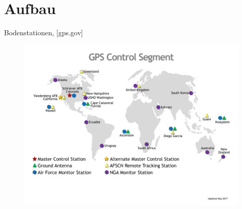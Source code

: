 \section{Aufbau}
\begin{frame}{Bodenstationen, {\small [gps.gov]}}
    \begin{figure}
        \centering
        \includegraphics[height=1.1\textheight]{images/GPS-control-segment-map.pdf}
    \end{figure}
\end{frame}

